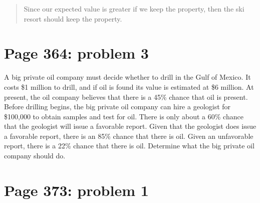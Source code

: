 \documentclass[]{article}
\begin{document}
\begin{quote}
Since our expected value is greater if we keep the property, then the
ski resort should keep the property.
\end{quote}

\section{Page 364: problem 3}\label{page-364-problem-3}

A big private oil company must decide whether to drill in the Gulf of
Mexico. It costs \$1 million to drill, and if oil is found its value is
estimated at \$6 million. At present, the oil company believes that
there is a 45\% chance that oil is present. Before drilling begins, the
big private oil company can hire a geologist for \$100,000 to obtain
samples and test for oil. There is only about a 60\% chance that the
geologist will issue a favorable report. Given that the geologist does
issue a favorable report, there is an 85\% chance that there is oil.
Given an unfavorable report, there is a 22\% chance that there is oil.
Determine what the big private oil company should do.

\section{Page 373: problem 1}\label{page-373-problem-1}
\end{document}
